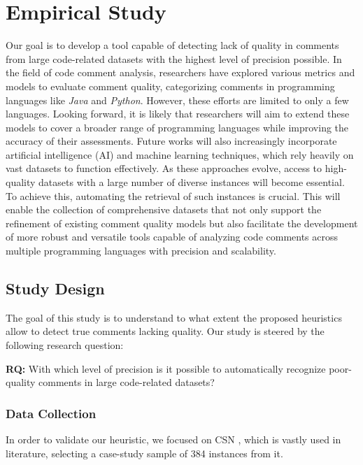 
\chapter{Empirical Study} %

\label{Chapter4}


Our goal is to develop a tool capable of detecting lack of quality in comments from large code-related datasets with the highest level of precision possible. In the field of code comment analysis, researchers have explored various metrics and models to evaluate comment quality, categorizing comments in programming languages like \textit{Java} and \textit{Python}. However, these efforts are limited to only a few languages.
Looking forward, it is likely that researchers will aim to extend these models to cover a broader range of programming languages while improving the accuracy of their assessments. Future works will also increasingly incorporate artificial intelligence (AI) and machine learning techniques, which rely heavily on vast datasets to function effectively. As these approaches evolve, access to high-quality datasets with a large number of diverse instances will become essential.
To achieve this, automating the retrieval of such instances is crucial. This will enable the collection of comprehensive datasets that not only support the refinement of existing comment quality models but also facilitate the development of more robust and versatile tools capable of analyzing code comments across multiple programming languages with precision and scalability.

\section{Study Design}
The goal of this study is to understand to what extent the proposed heuristics allow to detect true comments lacking quality. Our study is steered by the following research
question:
\begin{large}
	\begin{Center}
		\textbf{RQ:} With which level of precision is it possible to automatically recognize poor-quality comments in large code-related datasets?
	\end{Center}
\end{large}

\subsection{Data Collection}
In order to validate our heuristic, we focused on CSN \cite{CSN}, which is vastly used in literature, selecting a case-study sample of 384 instances from it.

